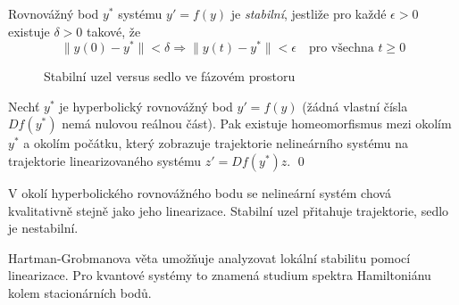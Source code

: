 \begin{definition}
Rovnovážný bod $y^*$ systému $y' = f(y)$ je \emph{stabilní}, jestliže pro každé $\epsilon > 0$ existuje $\delta > 0$ takové, že
\[
\|y(0) - y^*\| < \delta \Rightarrow \|y(t) - y^*\| < \epsilon \quad \text{pro všechna } t \geq 0
\]
\end{definition}

\begin{figure}[htbp]
\centering
{}
\caption{Stabilní uzel versus sedlo ve fázovém prostoru}
\label{fig:stability-types}
\end{figure}

\begin{theorem}
Nechť $y^*$ je hyperbolický rovnovážný bod $y' = f(y)$ (žádná vlastní čísla $Df(y^*)$ nemá nulovou reálnou část). Pak existuje homeomorfismus mezi okolím $y^*$ a okolím počátku, který zobrazuje trajektorie nelineárního systému na trajektorie linearizovaného systému $z' = Df(y^*)z$.
\qed
\end{theorem}

\begin{intuition}
V okolí hyperbolického rovnovážného bodu se nelineární systém chová kvalitativně stejně jako jeho linearizace. Stabilní uzel přitahuje trajektorie, sedlo je nestabilní.
\end{intuition}

\begin{keyinsight}
Hartman-Grobmanova věta umožňuje analyzovat lokální stabilitu pomocí linearizace. Pro kvantové systémy to znamená studium spektra Hamiltoniánu kolem stacionárních bodů.
\end{keyinsight}


